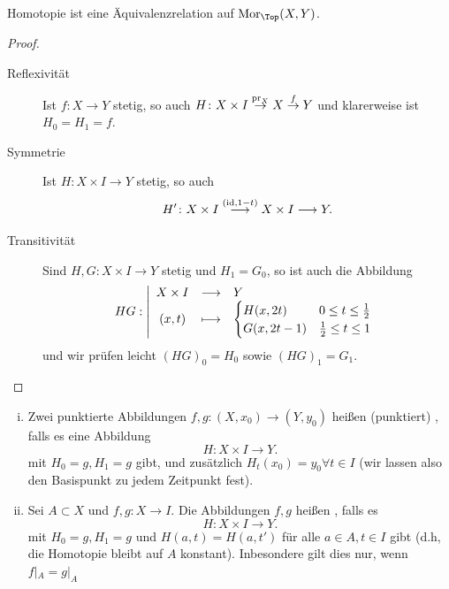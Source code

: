 \begin{lemma}
    Homotopie ist eine Äquivalenzrelation auf $\Mor_{\Top}(X,Y)$.
\end{lemma}
\begin{proof}
    \begin{description}
        \item[Reflexivität] Ist $f\colon  X \to  Y$ stetig, so auch  $H \colon  X \times I \stackrel{\operatorname{pr}_X}{\to } X \stackrel{f}{\to } Y $ und klarerweise ist $H_0 = H_1 = f$.
        \item[Symmetrie] Ist $H \colon  X \times I \to  Y$ stetig, so auch
            \[
                H' \colon  X \times I \stackrel{(\operatorname{id}, 1-t)}{\longrightarrow}  X\times I \longrightarrow  Y
            .\] 
        \item[Transitivität] Sind $H,G \colon  X \times I \to  Y$ stetig und $H_1 = G_0$, so ist auch die Abbildung
                \begin{equation*}
                HG: \left| \begin{array}{c c l} 
                X\times I & \longrightarrow & Y \\
                (x,t) & \longmapsto &  \begin{cases}
                    H(x,2t) & 0 \leq  t \leq  \frac{1}{2} \\
                    G(x, 2t-1) & \frac{1}{2}\leq t\leq 1
                \end{cases}
                \end{array} \right.
            \end{equation*}
            und wir prüfen leicht $(HG)_0 = H_0$ sowie $(HG)_1 = G_1$.
    \end{description}
\end{proof}

\begin{definition}\label{def:homotopie-relativ-einer-menge}
    \begin{enumerate}[i)]
        \item 
    Zwei punktierte Abbildungen $f,g \colon  (X,x_0) \to  (Y,y_0)$ heißen (punktiert) , falls es eine Abbildung
    \[
    H \colon  X \times I \to  Y
    .\] 
    mit $H_0 = g, H_1 = g$ gibt, und zusätzlich $H_t(x_0) = y_0 \forall t\in I$ (wir lassen also den Basispunkt zu jedem Zeitpunkt fest).
\item Sei $A\subset X$ und $f,g\colon  X \to  I$. Die Abbildungen $f,g$ heißen  , falls es
    \[
    H \colon  X \times I \to  Y
    .\] 
    mit $H_0 = g, H_1 = g$ und $H(a,t) = H(a,t')$ für alle  $a\in A, t\in I$ gibt (d.h, die Homotopie bleibt auf $A$ konstant). Inbesondere gilt dies nur, wenn  $f|_A = g|_A$
    \end{enumerate}
\end{definition}

